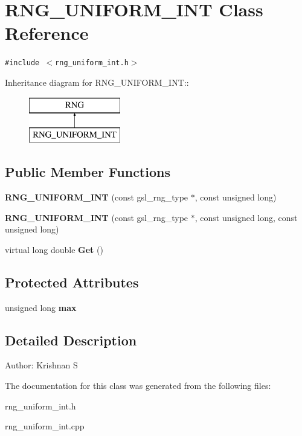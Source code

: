\section{RNG\_\-UNIFORM\_\-INT Class Reference}
\label{classRNG__UNIFORM__INT}
{\tt \#include $<$rng\_\-uniform\_\-int.h$>$}

Inheritance diagram for RNG\_\-UNIFORM\_\-INT::\begin{figure}[H]
\begin{center}
\leavevmode
\includegraphics[height=2cm]{classRNG__UNIFORM__INT}
\end{center}
\end{figure}
\subsection*{Public Member Functions}
\begin{CompactItemize}
\item 
\textbf{RNG\_\-UNIFORM\_\-INT} (const gsl\_\-rng\_\-type $\ast$, const unsigned long)\label{classRNG__UNIFORM__INT_058d4b1ce58e8a2324fbcd97c8fe99a4}

\item 
\textbf{RNG\_\-UNIFORM\_\-INT} (const gsl\_\-rng\_\-type $\ast$, const unsigned long, const unsigned long)\label{classRNG__UNIFORM__INT_470ef4868fb284074ece8e046dec8b12}

\item 
virtual long double \textbf{Get} ()\label{classRNG__UNIFORM__INT_752287963156809b16d68705424c703d}

\end{CompactItemize}
\subsection*{Protected Attributes}
\begin{CompactItemize}
\item 
unsigned long \textbf{max}\label{classRNG__UNIFORM__INT_3e2c830285eacf4fe69b2579fc1c2f02}

\end{CompactItemize}


\subsection{Detailed Description}
\begin{Desc}
\item[Author:]Krishnan S \end{Desc}




The documentation for this class was generated from the following files:\begin{CompactItemize}
\item 
rng\_\-uniform\_\-int.h\item 
rng\_\-uniform\_\-int.cpp\end{CompactItemize}
